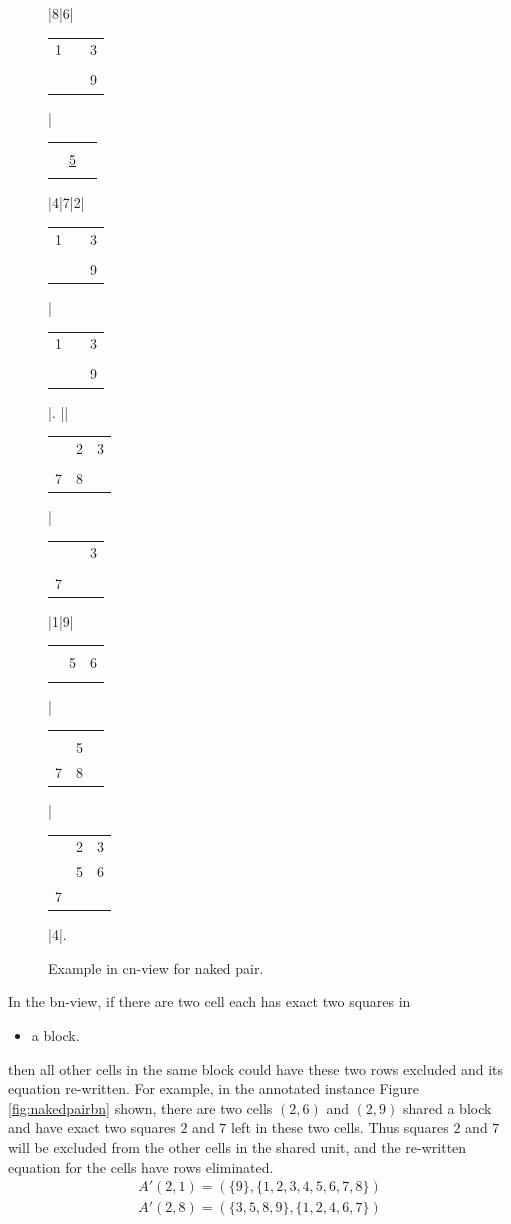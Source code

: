 \documentclass[11pt]{report}
\newcommand{\cell}[9]{%
\scriptsize
\setlength{\tabcolsep}{1pt}
\renewcommand{\arraystretch}{0.5}
\hspace{-0.6em}
\begin{tabular}{ccc}
#1 & #2 & #3\\
#4 & #5 & #6\\
#7 & #8 & #9
\end{tabular}
}
\newcommand{\set}[1]{\{ #1 \}}
\begin{document}
\begin{figure}[htbp]
\begin{sudoku}
|{8}|6|{\cell 1{}3{}{}{}{}{}9}|{\cell {}{}{}{}{\underline 5}{}{}{}{}}|4|7|2|{\cell 1{}3{}{}{}{}{}9}|{\cell 1{}3{}{}{}{}{}9}|.
|{\makebox[0pt]{\hspace{-2.1em}\large c9}{\cell {}23{}56{}{}{}}}|{\cell {}23{}{}{}78{}}|{\cell {}{}3{}{}{}7{}{}}|1|9|{\cell {}{}{}{}56{}{}{}}|{\cell {}{}{}{}5{}78{}}|{\cell {}23{}567{}{}}|4|.
\end{sudoku}
\caption{Example in cn-view for naked pair.}
\label{fig:nakedpaircn}
\end{figure}

In the bn-view, if there are two cell each has exact two squares in
\begin{itemize}
\item a block.
\end{itemize}
then all other cells in the same block could have these two rows excluded and its equation re-written. For example, in the annotated instance Figure \ref{fig:nakedpairbn} shown, there are two cells $(2,6)$ and $(2,9)$ shared a block and have exact two squares $2$ and $7$ left in these two cells. Thus squares $2$ and $7$ will be excluded from the other cells in the shared unit, and the re-written equation for the cells have rows eliminated.
\begin{eqnarray*}
A'(2,1) = (\set{9}, \set{1, 2, 3, 4, 5, 6, 7, 8})\\
A'(2,8) = (\set{3, 5, 8, 9}, \set{1, 2 ,4 ,6, 7})\\
\end{eqnarray*}
\end{document}
